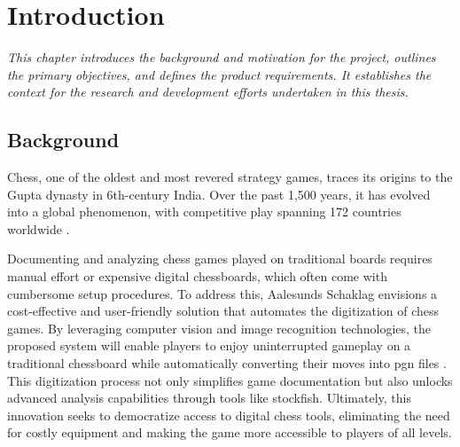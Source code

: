 \chapter{Introduction}

\begin{center}
    \textit{This chapter introduces the background and motivation for the project, outlines the primary objectives, and defines the product requirements. It establishes the context for the research and development efforts undertaken in this thesis.}   
\end{center}

\section{Background}

Chess, one of the oldest and most revered strategy games, traces its origins to the Gupta dynasty in 6th-century India. Over the past 1,500 years, it has evolved into a global phenomenon, with competitive play spanning 172 countries worldwide \cite{artsnculture}.






Documenting and analyzing chess games played on traditional boards requires manual effort or expensive digital chessboards, which often come with cumbersome setup procedures. To address this, Aalesunds Schaklag envisions a cost-effective and user-friendly solution that automates the digitization of chess games. By leveraging computer vision and image recognition technologies, the proposed system will enable players to enjoy uninterrupted gameplay on a traditional chessboard while automatically converting their moves into \gls{pgn} files \cite{ntnuopen:21}. This digitization process not only simplifies game documentation but also unlocks advanced analysis capabilities through tools like \gls{stockfish}. Ultimately, this innovation seeks to democratize access to digital chess tools, eliminating the need for costly equipment and making the game more accessible to players of all levels.

